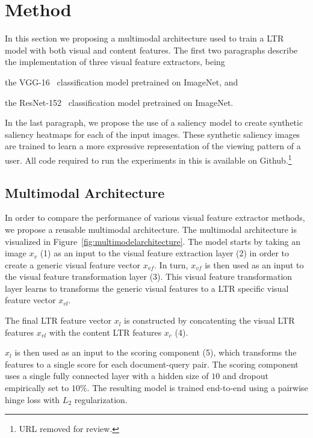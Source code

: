 
\section{Method}
In this section we proposing a multimodal architecture used to train a \ac{LTR} model with both visual and content features. 
The first two paragraphs describe the implementation of three visual feature extractors, being 
\begin{inparaenum}[(i)]
\item the VGG-16~\cite{simonyan2014very} classification model pretrained on ImageNet, and
\item the ResNet-152~\cite{he2016deep} classification model pretrained on ImageNet.
\end{inparaenum} 
In the last paragraph, we propose the use of a saliency model to create synthetic saliency heatmaps for each of the input images. These synthetic saliency images are trained to learn a more expressive representation of the viewing pattern of a user. 
All code required to run the experiments in this is available on Github.\footnote{URL removed for review.}

\subsection{Multimodal Architecture}
In order to compare the performance of various visual feature extractor methods, we propose a reusable multimodal architecture. 
The multimodal architecture is visualized in Figure~\ref{fig:multimodelarchitecture}. 
The model starts by taking an image $x_{v}$ (1) as an input to the visual feature extraction layer (2) in order to create a generic visual feature vector $x_{vf}$. In turn, $x_{vf}$ is then used as an input to the visual feature transformation layer (3).
This visual feature transformation layer learns to transforms the generic visual features to a \ac{LTR} specific visual feature vector $x_{vl}$.

The final \ac{LTR} feature vector $x_{l}$ is constructed by concatenting the visual \ac{LTR} features $x_{vl}$ with the content \ac{LTR} features $x_{c}$ (4). 

$x_{l}$ is then used as an input to the scoring component (5), which transforms the features to a single score for each document-query pair. The scoring component uses a single fully connected layer with a hidden size of $10$ and dropout empirically set to $10\%$. The resulting model is trained end-to-end using a pairwise hinge loss with $L_2$ regularization. 

